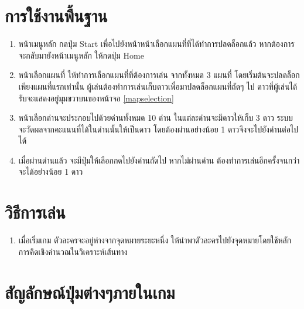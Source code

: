 \section{การใช้งานพื้นฐาน}
\begin{enumerate}
    \item หน้าเมนูหลัก กดปุ่ม Start เพื่อไปยังหน้าหน้าเลือกแผนที่ที่ได้ทำการปลดล็อกแล้ว หากต้องการจะกลับมายังหน้าเมนูหลัก ให้กดปุ่ม Home
    \item หน้าเลือกแผนที่ ให้ทำการเลือกแผนที่ที่ต้องการเล่น จากทั้งหมด 3 แผนที่ โดยเริ่มต้นจะปลดล็อกเพียงแผนที่แรกเท่านั้น ผู้เล่นต้องทำการเล่นเก็บดาวเพื่อมาปลดล็อกแผนที่ถัดๆ ไป ดาวที่ผู้เล่นได้รับจะแสดงอยู่มุมขวาบนของหน้าจอ \ref{mapselection}
    \item หน้าเลือกด่านจะประกอบไปด้วยด่านทั้งหมด 10 ด่าน ในแต่ละด่านจะมีดาวให้เก็บ 3 ดาว ระบบจะวัดผลจากคะแนนที่ได้ในด่านนั้นให้เป็นดาว โดยต้องผ่านอย่างน้อย 1 ดาวจึงจะไปยังด่านต่อไปได้
    \item เมื่อผ่านด่านแล้ว จะมีปุ่มให้เลือกกดไปยังด่านถัดไป หากไม่ผ่านด่าน ต้องทำการเล่นอีกครั้งจนกว่าจะได้อย่างน้อย 1 ดาว
\end{enumerate}

\section{วิธีการเล่น}
\begin{enumerate}
    \item เมื่อเริ่มเกม ตัวละครจะอยู่ห่างจากจุดหมายระยะหนึ่ง ให้นำพาตัวละครไปยังจุดหมายโดยใช้หลักการคิดเชิงคำนวณในวิเคราะห์เส้นทาง 
    
\end{enumerate}

\section{สัญลักษณ์ปุ่มต่างๆภายในเกม}

